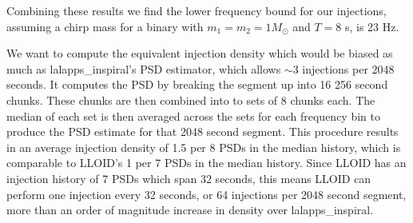 Combining these results we find the lower frequency bound for our injections,
assuming a chirp mass for a binary with $m_1 = m_2 = 1 M_{\odot}$ and $T = 8$
s, is 23 Hz.

We want to compute the equivalent injection density which would be biased as
much as lalapps\_inspiral's PSD estimator, which allows $\sim3$ injections per
2048 seconds. It computes the PSD by breaking the segment up into 16 256 second
chunks. These chunks are then combined into to sets of 8 chunks each. The
median of each set is then averaged across the sets for each frequency bin to
produce the PSD estimate for that 2048 second segment. This procedure results
in an average injection density of 1.5 per 8 PSDs in the median history, which
is comparable to LLOID's 1 per 7 PSDs in the median history. Since LLOID has an
injection history of 7 PSDs which span 32 seconds, this means LLOID can perform
one injection every 32 seconds, or 64 injections per 2048 second segment, more
than an order of magnitude increase in density over lalapps\_inspiral.



